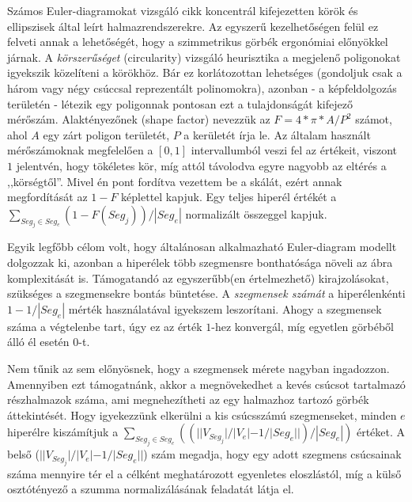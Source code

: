 Számos Euler-diagramokat vizsgáló cikk koncentrál kifejezetten körök és ellipszisek által leírt halmazrendszerekre. Az egyszerű kezelhetőségen felül ez felveti annak a lehetőségét, hogy a szimmetrikus görbék ergonómiai előnyökkel járnak. A \textit{körszerűséget} (circularity) vizsgáló heurisztika a megjelenő poligonokat igyekszik közelíteni a körökhöz. Bár ez korlátozottan lehetséges (gondoljuk csak a három vagy négy csúccsal reprezentált polinomokra), azonban - a képfeldolgozás területén - létezik egy poligonnak pontosan ezt a tulajdonságát kifejező mérőszám. Alaktényezőnek (shape factor) nevezzük az $F = 4 * \pi * A / P^2$ számot, ahol $A$ egy zárt poligon területét, $P$ a kerületét írja le. Az általam használt mérőszámoknak megfelelően a $[0,1]$ intervallumból veszi fel az értékeit, viszont $1$ jelentvén, hogy tökéletes kör, míg attól távolodva egyre nagyobb az eltérés a ,,körségtől''. Mivel én pont fordítva vezettem be a skálát, ezért annak megfordítását az $1-F$ képlettel kapjuk. Egy teljes hiperél értékét a $\sum_{Seg_j \in Seg_{e}} (1 - F(Seg_j)) / |Seg_{e}|$ normalizált összeggel kapjuk.


Egyik legfőbb célom volt, hogy általánosan alkalmazható Euler-diagram modellt dolgozzak ki, azonban a hiperélek több szegmensre bonthatósága növeli az ábra komplexitását is. Támogatandó az egyszerűbb(en értelmezhető) kirajzolásokat, szükséges a szegmensekre bontás büntetése. A \textit{szegmensek számát} a hiperélenkénti $1-1/|Seg_e|$ mérték használatával igyekszem leszorítani. Ahogy a szegmensek száma a végtelenbe tart, úgy ez az érték $1$-hez konvergál, míg egyetlen görbéből álló él esetén $0$-t.


Nem tűnik az sem előnyösnek, hogy a szegmensek mérete nagyban ingadozzon. Amennyiben ezt támogatnánk, akkor a megnövekedhet a kevés csúcsot tartalmazó részhalmazok száma, ami megnehezítheti az egy halmazhoz tartozó görbék áttekintését. Hogy igyekezzünk elkerülni a kis csúcsszámú szegmenseket, minden $e$ hiperélre kiszámítjuk a $\sum_{Seg_j \in Seg_e}((||V_{Seg_j}| / |V_e| - 1 / |Seg_e| |) / |Seg_e|)$ értéket. A belső ($||V_{Seg_j}| / |V_e| - 1 / |Seg_e| |$) szám megadja, hogy egy adott szegmens csúcsainak száma mennyire tér el a célként meghatározott egyenletes eloszlástól, míg a külső osztótényező a szumma normalizálásának feladatát látja el.


